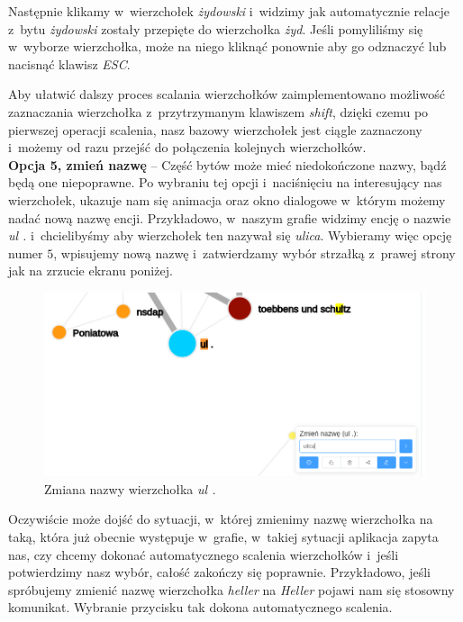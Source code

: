 \documentclass[12pt, a4paper]{article}
\begin{document}
Następnie klikamy w~wierzchołek \textit{żydowski} i~widzimy jak automatycznie relacje z~bytu \textit{żydowski} zostały przepięte do wierzchołka \textit{żyd}. Jeśli pomyliliśmy się w~wyborze wierzchołka, może na niego kliknąć ponownie aby go odznaczyć lub nacisnąć klawisz \textit{ESC}.

Aby ułatwić dalszy proces scalania wierzchołków zaimplementowano możliwość zaznaczania wierzchołka z~przytrzymanym klawiszem \textit{shift}, dzięki czemu po pierwszej operacji scalenia, nasz bazowy wierzchołek jest ciągle zaznaczony i~możemy od razu przejść do połączenia kolejnych wierzchołków.\\

\noindent \textbf{Opcja 5, zmień nazwę} -- Część bytów może mieć niedokończone nazwy, bądź będą one niepoprawne. Po wybraniu tej opcji i~naciśnięciu na interesujący nas wierzchołek, ukazuje nam się animacja oraz okno dialogowe w~którym możemy nadać nową nazwę encji. Przykładowo, w~naszym grafie widzimy encję o nazwie \textit{ul .} i~chcielibyśmy aby wierzchołek ten nazywał się \textit{ulica}. Wybieramy więc opcję numer $5$, wpisujemy nową nazwę i~zatwierdzamy wybór strzałką z~prawej strony jak na zrzucie ekranu poniżej.

\begin{figure}[H]
  \centering
  \includegraphics[width=\linewidth]{images/graph-ulica.png}
  \caption{Zmiana nazwy wierzchołka \textit{ul .}}
\end{figure}

Oczywiście może dojść do sytuacji, w~której zmienimy nazwę wierzchołka na taką, która już obecnie występuje w~grafie, w~takiej sytuacji aplikacja zapyta nas, czy chcemy dokonać automatycznego scalenia wierzchołków i~jeśli potwierdzimy nasz wybór, całość zakończy się poprawnie. Przykładowo, jeśli spróbujemy zmienić nazwę wierzchołka \textit{heller} na \textit{Heller} pojawi nam się stosowny komunikat. Wybranie przycisku tak dokona automatycznego scalenia.
\end{document}
